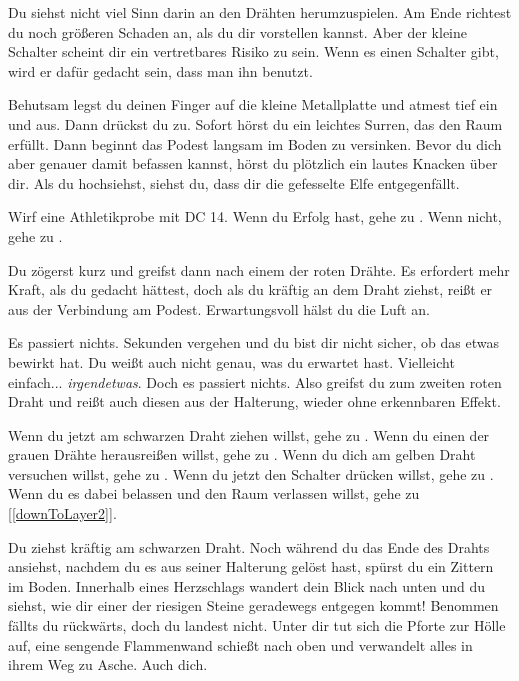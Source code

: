 
Du siehst nicht viel Sinn darin an den Drähten herumzuspielen. Am Ende richtest du noch größeren Schaden an, als du dir vorstellen kannst. Aber der kleine Schalter scheint dir ein vertretbares Risiko zu sein. Wenn es einen Schalter gibt, wird er dafür gedacht sein, dass man ihn benutzt.

Behutsam legst du deinen Finger auf die kleine Metallplatte und atmest tief ein und aus. Dann drückst du zu. Sofort hörst du ein leichtes Surren, das den Raum erfüllt. Dann beginnt das Podest langsam im Boden zu versinken. Bevor du dich aber genauer damit befassen kannst, hörst du plötzlich ein lautes Knacken über dir. Als du hochsiehst, siehst du, dass dir die gefesselte Elfe entgegenfällt.

Wirf eine Athletikprobe mit DC 14. Wenn du Erfolg hast, gehe zu . Wenn nicht, gehe zu .


Du zögerst kurz und greifst dann nach einem der roten Drähte. Es erfordert mehr Kraft, als du gedacht hättest, doch als du kräftig an dem Draht ziehst, reißt er aus der Verbindung am Podest. Erwartungsvoll hälst du die Luft an.

Es passiert nichts. Sekunden vergehen und du bist dir nicht sicher, ob das etwas bewirkt hat. Du weißt auch nicht genau, was du erwartet hast. Vielleicht einfach... \textit{irgendetwas}. Doch es passiert nichts. Also greifst du zum zweiten roten Draht und reißt auch diesen aus der Halterung, wieder ohne erkennbaren Effekt.

Wenn du jetzt am schwarzen Draht ziehen willst, gehe zu .
Wenn du einen der grauen Drähte herausreißen willst, gehe zu .
Wenn du dich am gelben Draht versuchen willst, gehe zu .
Wenn du jetzt den Schalter drücken willst, gehe zu .
Wenn du es dabei belassen und den Raum verlassen willst, gehe zu [\ref{downToLayer2}].


Du ziehst kräftig am schwarzen Draht. Noch während du das Ende des Drahts ansiehst, nachdem du es aus seiner Halterung gelöst hast, spürst du ein Zittern im Boden. Innerhalb eines Herzschlags wandert dein Blick nach unten und du siehst, wie dir einer der riesigen Steine geradewegs entgegen kommt! Benommen fällts du rückwärts, doch du landest nicht. Unter dir tut sich die Pforte zur Hölle auf, eine sengende Flammenwand schießt nach oben und verwandelt alles in ihrem Weg zu Asche. Auch dich.

